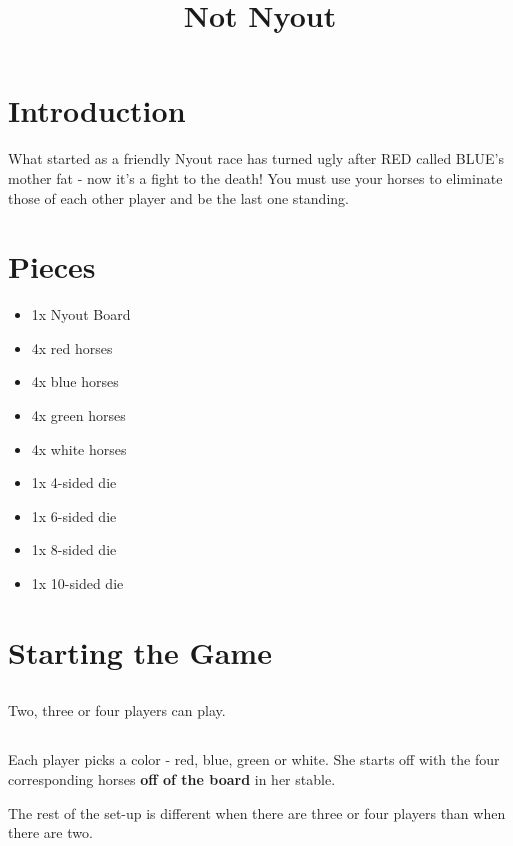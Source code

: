 \documentclass[12pt]{article} %
\date{}
\begin{document}
\title{Not Nyout}
\maketitle

\section{Introduction}

What started as a friendly Nyout race has turned ugly after RED called BLUE's mother fat - now it's a fight to the death!  You must use your horses to eliminate those of each other player and be the last one standing.

\section{Pieces}

\begin{itemize}
	\item 1x Nyout Board
	\item 4x red horses
	\item 4x blue horses
	\item 4x green horses
	\item 4x white horses
	\item 1x 4-sided die
	\item 1x 6-sided die
	\item 1x 8-sided die
	\item 1x 10-sided die
\end{itemize}

\section{Starting the Game}

\subsection{}
Two, three or four players can play.

\subsection{}
Each player picks a color - red, blue, green or white. She starts off with the four corresponding horses \textbf{off of the board} in her stable. \newline

The rest of the set-up is different when there are three or four players than when there are two.
\end{document}

